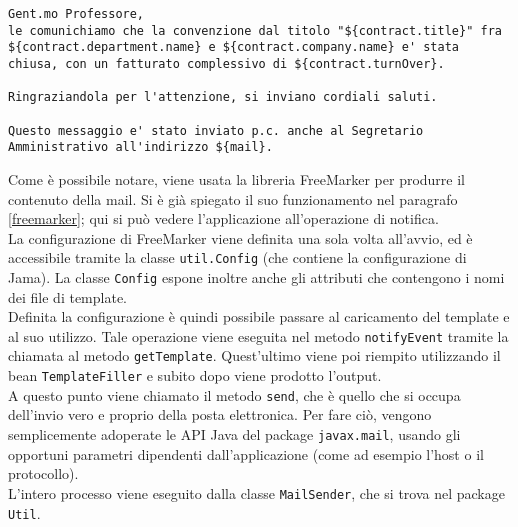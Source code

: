 \begin{lstlisting}
Gent.mo Professore,
le comunichiamo che la convenzione dal titolo "${contract.title}" fra ${contract.department.name} e ${contract.company.name} e' stata chiusa, con un fatturato complessivo di ${contract.turnOver}.

Ringraziandola per l'attenzione, si inviano cordiali saluti.

Questo messaggio e' stato inviato p.c. anche al Segretario Amministrativo all'indirizzo ${mail}.
\end{lstlisting}

Come è possibile notare, viene usata la libreria FreeMarker per produrre il contenuto della mail. Si è già spiegato il suo funzionamento nel paragrafo \ref{freemarker}; qui si può vedere l'applicazione all'operazione di notifica.\\
La configurazione di FreeMarker viene definita una sola volta all'avvio, ed è accessibile tramite la classe \lstinline{util.Config} (che contiene la configurazione di Jama). La classe \lstinline{Config} espone inoltre anche gli attributi che contengono i nomi dei file di template.\\
Definita la configurazione è quindi possibile passare al caricamento del template e al suo utilizzo. Tale operazione viene eseguita nel metodo \lstinline{notifyEvent} tramite la chiamata al metodo \lstinline{getTemplate}. Quest'ultimo viene poi riempito utilizzando il bean \lstinline{TemplateFiller} e subito dopo viene prodotto l'output. \\
A questo punto viene chiamato il metodo \lstinline{send}, che è quello che si occupa dell'invio vero e proprio della posta elettronica. Per fare ciò, vengono semplicemente adoperate le API Java del package \lstinline{javax.mail}, usando gli opportuni parametri dipendenti dall'applicazione (come ad esempio l'host o il protocollo).\\
L'intero processo viene eseguito dalla classe \lstinline{MailSender}, che si trova nel package \lstinline{Util}.

